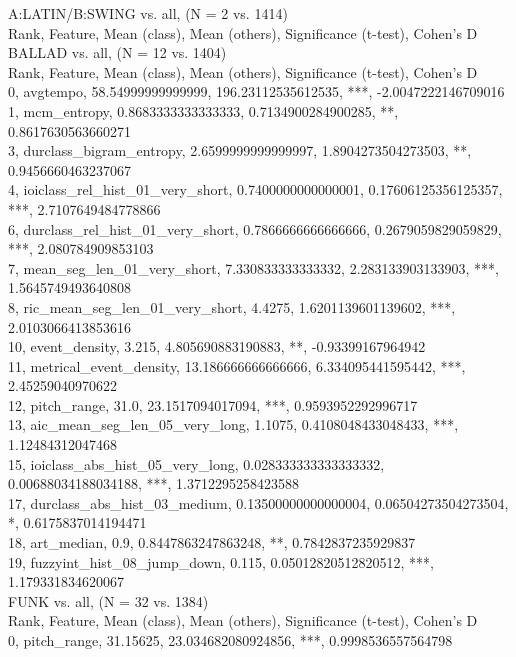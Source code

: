 A:LATIN/B:SWING vs. all, (N = 2 vs. 1414)\\
Rank, Feature, Mean (class), Mean (others), Significance (t-test), Cohen's D\\
BALLAD vs. all, (N = 12 vs. 1404)\\
Rank, Feature, Mean (class), Mean (others), Significance (t-test), Cohen's D\\
0, avgtempo, 58.54999999999999, 196.23112535612535, ***, -2.0047222146709016\\
1, mcm_entropy, 0.8683333333333333, 0.7134900284900285, **, 0.8617630563660271\\
3, durclass_bigram_entropy, 2.6599999999999997, 1.8904273504273503, **, 0.9456660463237067\\
4, ioiclass_rel_hist_01_very_short, 0.7400000000000001, 0.17606125356125357, ***, 2.7107649484778866\\
6, durclass_rel_hist_01_very_short, 0.7866666666666666, 0.2679059829059829, ***, 2.080784909853103\\
7, mean_seg_len_01_very_short, 7.330833333333332, 2.283133903133903, ***, 1.5645749493640808\\
8, ric_mean_seg_len_01_very_short, 4.4275, 1.6201139601139602, ***, 2.0103066413853616\\
10, event_density, 3.215, 4.805690883190883, **, -0.93399167964942\\
11, metrical_event_density, 13.186666666666666, 6.334095441595442, ***, 2.45259040970622\\
12, pitch_range, 31.0, 23.1517094017094, ***, 0.9593952292996717\\
13, aic_mean_seg_len_05_very_long, 1.1075, 0.4108048433048433, ***, 1.12484312047468\\
15, ioiclass_abs_hist_05_very_long, 0.028333333333333332, 0.00688034188034188, ***, 1.3712295258423588\\
17, durclass_abs_hist_03_medium, 0.13500000000000004, 0.06504273504273504, *, 0.6175837014194471\\
18, art_median, 0.9, 0.8447863247863248, **, 0.7842837235929837\\
19, fuzzyint_hist_08_jump_down, 0.115, 0.05012820512820512, ***, 1.179331834620067\\
FUNK vs. all, (N = 32 vs. 1384)\\
Rank, Feature, Mean (class), Mean (others), Significance (t-test), Cohen's D\\
0, pitch_range, 31.15625, 23.034682080924856, ***, 0.9998536557564798\\
